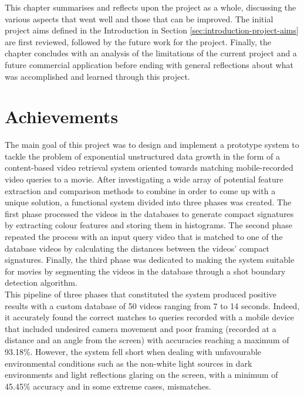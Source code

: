 This chapter summarises and reflects upon the project as a whole, discussing the various aspects that went well and those that can be improved. The initial project aims defined in the Introduction in Section \ref{sec:introduction-project-aims} are first reviewed, followed by the future work for the project. Finally, the chapter concludes with an analysis of the limitations of the current project and a future commercial application before ending with general reflections about what was accomplished and learned through this project.


\section{Achievements}

The main goal of this project was to design and implement a prototype system to tackle the problem of exponential unstructured data growth in the form of a content-based video retrieval system oriented towards matching mobile-recorded video queries to a movie. After investigating a wide array of potential feature extraction and comparison methods to combine in order to come up with a unique solution, a functional system divided into three phases was created. The first phase processed the videos in the databases to generate compact signatures by extracting colour features and storing them in histograms. The second phase repeated the process with an input query video that is matched to one of the database videos by calculating the distances between the videos' compact signatures. Finally, the third phase was dedicated to making the system suitable for movies by segmenting the videos in the database through a shot boundary detection algorithm.\\

This pipeline of three phases that constituted the system produced positive results with a custom database of 50 videos ranging from 7 to 14 seconds. Indeed, it accurately found the correct matches to queries recorded with a mobile device that included undesired camera movement and poor framing (recorded at a distance and an angle from the screen) with accuracies reaching a maximum of 93.18\%. However, the system fell short when dealing with unfavourable environmental conditions such as the non-white light sources in dark environments and light reflections glaring on the screen, with a minimum of 45.45\% accuracy and in some extreme cases, mismatches.\\

